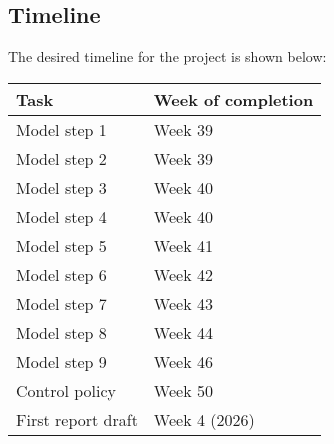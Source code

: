 \subsection{Timeline}
The desired timeline for the project is shown below:

\begin{table}[h]
\center
\begin{tabular}{l|l}
Task           & Week of completion \\ \hline
Model step 1   & Week 39\footnotemark[1]           \\
Model step 2   & Week 39\footnotemark[1]            \\
Model step 3   & Week 40            \\
Model step 4   & Week 40            \\
Model step 5   & Week 41            \\
Model step 6   & Week 42            \\
Model step 7   & Week 43            \\
Model step 8   & Week 44            \\
Model step 9   & Week 46            \\
Control policy & Week 50           \\
First report draft & Week 4 (2026)
\end{tabular}
\end{table}
